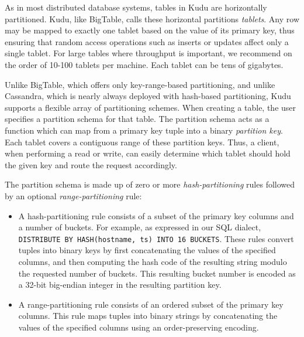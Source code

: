 \documentclass[twocolumn,9pt]{article}
\begin{document}
As in most distributed database systems, tables in Kudu are horizontally partitioned. Kudu, like
BigTable, calls these horizontal partitions {\em tablets}. Any row may be mapped to exactly one
tablet based on the value of its primary key, thus ensuring that random access operations such as
inserts or updates affect only a single tablet. For large tables where throughput is important, we
recommend on the order of 10-100 tablets per machine. Each tablet can be tens of gigabytes.

Unlike BigTable, which offers only key-range-based partitioning, and unlike Cassandra, which is
nearly always deployed with hash-based partitioning, Kudu supports a flexible array of partitioning
schemes. When creating a table, the user specifies a partition schema for that table. The partition schema
acts as a function which can map from a primary key tuple into a binary {\em partition key}. Each
tablet covers a contiguous range of these partition keys. Thus, a client, when performing a read or
write, can easily determine which tablet should hold the given key and route the request
accordingly.

The partition schema is made up of zero or more {\em hash-partitioning} rules followed by an
optional {\em range-partitioning} rule:
\begin{itemize}
\item A hash-partitioning rule consists of a subset of the primary key columns and a number of
  buckets. For example, as expressed in our SQL dialect, {\tt DISTRIBUTE BY HASH(hostname, ts) INTO
  16 BUCKETS}. These rules convert tuples into binary keys by first concatenating the values
  of the specified columns, and then computing the hash code of the resulting string
  modulo the requested number of buckets. This resulting bucket number is encoded as a 32-bit
  big-endian integer in the resulting partition key.

\item A range-partitioning rule consists of an ordered subset of the primary key columns. This
  rule maps tuples into binary strings by concatenating the values of the specified columns
  using an order-preserving encoding.
\end{itemize}

\begin{comment}
When concatenating multiple values to form a compound partition key, it is important to ensure
that tuples are encoded uniquely and in such a way as to preserve their original lexicographic
sort order. For example, the tuple {\tt ('foo', 'bar')} must be distinguished from {\tt ('foob', 'ar')}.
To achieve this, while still allowing arbitrary binary values in user-supplied data,  we insert two null
bytes after each variable-length component in the compound key, and encode null bytes in the original values
as {\tt \textbackslash x00\textbackslash x01}.
\end{comment}
\end{document}
